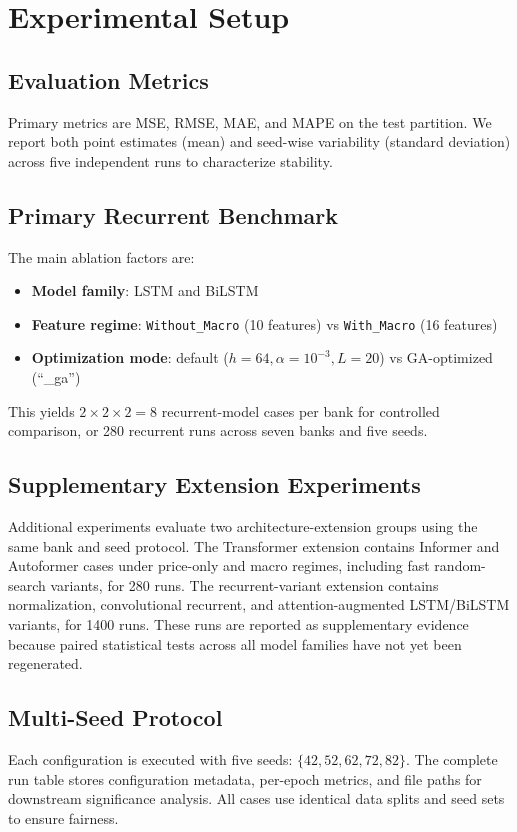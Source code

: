 \section{Experimental Setup}

\subsection{Evaluation Metrics}
Primary metrics are MSE, RMSE, MAE, and MAPE on the test partition. We report both point estimates (mean) and seed-wise variability (standard deviation) across five independent runs to characterize stability.

\subsection{Primary Recurrent Benchmark}
The main ablation factors are:
\begin{itemize}
    \item \textbf{Model family}: LSTM and BiLSTM
    \item \textbf{Feature regime}: \texttt{Without\_Macro} (10 features) vs \texttt{With\_Macro} (16 features)
    \item \textbf{Optimization mode}: default ($h{=}64, \alpha{=}10^{-3}, L{=}20$) vs GA-optimized (``\_ga'')
\end{itemize}
This yields $2 \times 2 \times 2 = 8$ recurrent-model cases per bank for controlled comparison, or 280 recurrent runs across seven banks and five seeds.

\subsection{Supplementary Extension Experiments}
Additional experiments evaluate two architecture-extension groups using the same bank and seed protocol. The Transformer extension contains Informer and Autoformer cases under price-only and macro regimes, including fast random-search variants, for 280 runs. The recurrent-variant extension contains normalization, convolutional recurrent, and attention-augmented LSTM/BiLSTM variants, for 1400 runs. These runs are reported as supplementary evidence because paired statistical tests across all model families have not yet been regenerated.

\subsection{Multi-Seed Protocol}
Each configuration is executed with five seeds: $\{42, 52, 62, 72, 82\}$. The complete run table stores configuration metadata, per-epoch metrics, and file paths for downstream significance analysis. All cases use identical data splits and seed sets to ensure fairness.

